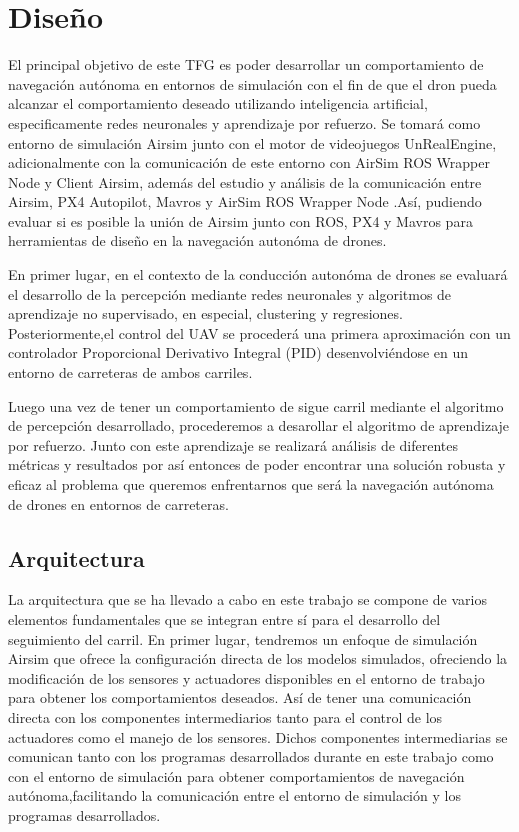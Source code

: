 \chapter{Diseño}
\label{cap:capitulo4}


\vspace{1cm}
El principal objetivo de este TFG es poder desarrollar un comportamiento de navegación autónoma en entornos de simulación 
con el fin de que el dron pueda alcanzar el comportamiento deseado utilizando inteligencia artificial, especificamente redes neuronales
y aprendizaje por refuerzo. Se tomará como entorno de simulación Airsim junto con el motor de videojuegos UnRealEngine, adicionalmente con 
la comunicación de este entorno con AirSim ROS Wrapper Node y Client Airsim, además del estudio y 
análisis de la comunicación entre Airsim, PX4 Autopilot, Mavros y AirSim ROS Wrapper Node .Así, pudiendo evaluar si es posible la unión de Airsim junto con ROS, PX4 y Mavros para
herramientas de diseño en la navegación autonóma de drones. \newline

En primer lugar, en el contexto de la conducción autonóma de drones se evaluará el desarrollo de la percepción mediante redes neuronales y algoritmos de
aprendizaje no supervisado, en especial, clustering y regresiones. 
Posteriormente,el control del UAV se procederá una primera aproximación con un controlador Proporcional Derivativo Integral (PID) desenvolviéndose
en un entorno de carreteras de ambos carriles. \newline

Luego una vez de tener un comportamiento de sigue carril mediante el algoritmo de percepción desarrollado, procederemos a desarollar el algoritmo de 
aprendizaje por refuerzo. Junto con este aprendizaje se realizará análisis de diferentes métricas y resultados
por así entonces de poder encontrar una solución robusta y eficaz al problema que queremos enfrentarnos que será la navegación autónoma de drones en
entornos de carreteras. \newline


\section{Arquitectura}
\label{sec:Arquitectura}

La arquitectura que se ha llevado a cabo en este trabajo se compone de varios elementos fundamentales que se integran entre sí para el desarrollo del seguimiento
del carril. En primer lugar, tendremos un enfoque de simulación Airsim que ofrece la configuración directa de los modelos simulados, ofreciendo la modificación de los sensores
y actuadores disponibles en el entorno de trabajo para obtener los comportamientos deseados. Así de tener una comunicación directa con los componentes intermediarios 
tanto para el control de los actuadores como el manejo de los sensores. Dichos componentes intermediarias se comunican tanto con los programas desarrollados durante en este 
trabajo como con el entorno de simulación para obtener comportamientos de navegación autónoma,facilitando la comunicación entre el entorno de simulación y los programas desarrollados.\newline


